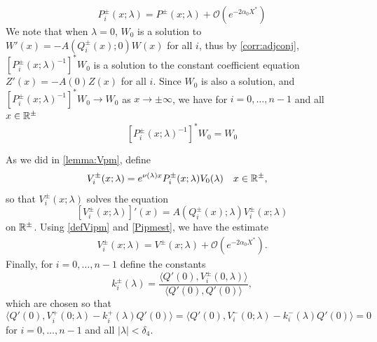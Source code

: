 \documentclass[10pt,reqno]{amsart}
\theoremstyle{plain}
\theoremstyle{definition}
\theoremstyle{remark}
\numberwithin{theorem}{section}
\numberwithin{equation}{section}
\begin{document}
\begin{equation}\label{Pipmest}
P_i^\pm(x; \lambda) = P^\pm(x; \lambda) + \mathcal{O}(e^{-2 \alpha_0 X^*})
\end{equation}
We note that when $\lambda = 0$, $W_0$ is a solution to $W'(x) = -A(Q_i^\pm(x); 0) W(x)$ for all $i$, thus by \cref{corr:adjconj}, $[P_i^\pm(x; \lambda)^{-1}]^* W_0$ is a solution to the constant coefficient equation $Z'(x) = -A(0) Z(x)$ for all $i$. Since $W_0$ is also a solution, and $[P_i^\pm(x; \lambda)^{-1}]^* W_0 \rightarrow W_0$ as $x \rightarrow \pm \infty$, we have for $i = 0, \dots, n-1$ and all $x \in \mathbb{R}^\pm$
\begin{equation}\label{W0conjeq}
[P_i^\pm(x; \lambda)^{-1}]^* W_0 = W_0
\end{equation}

As we did in \cref{lemma:Vpm}, define
\begin{align}\label{defVipm}
V_i^\pm(x; \lambda) &= e^{\nu(\lambda)x} P_i^\pm(x; \lambda)V_0(\lambda) && x \in \mathbb{R}^\pm,
\end{align}
so that $V_i^\pm(x; \lambda)$ solves the equation
\begin{equation}\label{PDEeigcenter}
[V_i^\pm(x; \lambda)]'(x) = A(Q_i^\pm(x); \lambda) V_i^\pm(x; \lambda)
\end{equation}
on $\mathbb{R}^\pm$. Using \cref{defVipm} and \cref{Pipmest}, we have the estimate
\begin{align}\label{Vipmest}
V_i^\pm(x; \lambda) = V^\pm(x; \lambda) + \mathcal{O}(e^{-2 \alpha_0 X^*}).
\end{align}
Finally, for $i = 0, \dots, n-1$ define the constants
\begin{equation}\label{defklambda}
k_i^\pm(\lambda) = \frac{\langle Q'(0), V_i^\pm(0, \lambda) \rangle}{\langle Q'(0), Q'(0) \rangle},
\end{equation}
which are chosen so that
\begin{equation}\label{klambdaIP}
\langle Q'(0), V_i^+(0; \lambda) - k_i^+(\lambda)Q'(0) \rangle = 
\langle Q'(0), V_i^-(0; \lambda) - k_i^-(\lambda)Q'(0) \rangle = 0
\end{equation}
for $i = 0, \dots, n-1$ and all $|\lambda| < \delta_4$. 
\end{document}
